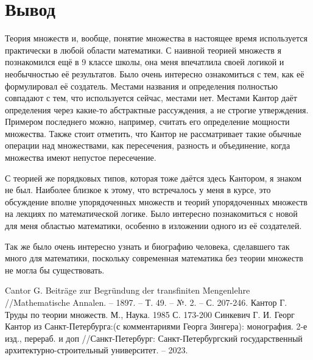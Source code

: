 \documentclass[a4paper,12pt]{extarticle}
\theoremstyle{definition}
\begin{document}
\section{Вывод}

Теория множеств и, вообще, понятие множества в настоящее время используется практически в любой области математики.
С наивной теорией множеств я познакомился ещё в 9 классе школы, она меня впечатлила своей логикой и необычностью её результатов.
Было очень интересно ознакомиться с тем, как её формулировал её создатель.
Местами названия и определения полностью совпадают с тем, что используется сейчас, местами нет.
Местами Кантор даёт определения через какие-то абстрактные рассуждения, а не строгие утверждения. 
Примером последнего можно, например, считать его определение мощности множества.
Также стоит отметить, что Кантор не рассматривает такие обычные операции над множествами, как пересечения, разность и объединение, когда множества имеют непустое пересечение.

С теорией же порядковых типов, которая тоже даётся здесь Кантором, я знаком не был.
Наиболее близкое к этому, что встречалось у меня в курсе, это обсуждение вполне упорядоченных множеств и теорий упорядоченных множеств на лекциях по математической логике.
Было интересно познакомиться с новой для меня областью математики, особенно в изложении одного из её создателей.

Так же было очень интересно узнать и биографию человека, сделавшего так много для математики, поскольку современная математика без теории множеств не могла бы существовать. 





\newpage

\begin{thebibliography}{}
     Cantor G. Beiträge zur Begründung der transfiniten Mengenlehre //Mathematische Annalen. -- 1897. -- Т. 49. -- №. 2. -- С. 207-246.
     Кантор Г. Труды по теории множеств. М., Наука. 1985 С. 173-200
     Синкевич Г. И. Георг Кантор из Санкт-Петербурга:(с комментариями Георга Зингера): монография. 2-е изд., перераб. и доп //Санкт-Петербург: Санкт-Петербургский государственный архитектурно-строительный университет. -- 2023.
\end{thebibliography}
\end{document}
